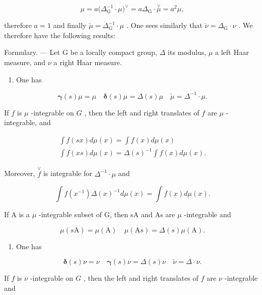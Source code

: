 \[
\mu = a \big (\Delta_ {\mathrm{G}} ^ {- 1} \cdot \mu \big) ^ {\vee} = a \Delta_ {\mathrm{G}} \cdot \stackrel {\vee} {\mu} = a ^ {2} \mu ,
\]

therefore \(a = 1\) and finally \(\check{\mu} = \Delta_{\mathrm{G}}^{-1}\cdot \mu\) . One sees similarly that \(\check{\nu} = \Delta_{\mathrm{G}}\cdot \nu\) . We therefore have the following results:

Formulary. --- Let G be a locally compact group, \(\Delta\) its modulus, \(\mu\) a left Haar measure, and \(\nu\) a right Haar measure.

\begin{enumerate}
\def\labelenumi{\arabic{enumi})}
\tightlist
\item
  One has
\end{enumerate}

\[
\boldsymbol {\gamma} (s) \mu = \mu \quad \boldsymbol {\delta} (s) \mu = \Delta (s) \mu \quad \check {\mu} = \Delta^ {- 1} \cdot \mu .\tag{20}
\]

If \(f\) is \(\mu\) -integrable on \(G\) , then the left and right translates of \(f\) are \(\mu\) -integrable, and

\[
\begin{array}{l} \int f (s x) d \mu (x) = \int f (x) d \mu (x) \\ \int f (x s) d \mu (x) = \Delta (s) ^ {- 1} \int f (x) d \mu (x). \end{array}\tag{21}
\]

Moreover, \(\stackrel{\vee}{f}\) is integrable for \(\Delta^{-1} \cdot \mu\) and

\[
\int f (x ^ {- 1}) \Delta (x) ^ {- 1} d \mu (x) = \int f (x) d \mu (x).\tag{22}
\]

If A is a \(\mu\) -integrable subset of G, then sA and As are \(\mu\) -integrable and

\[
\mu (s \mathrm{A}) = \mu (\mathrm{A}) \quad \mu (\mathrm{A} s) = \Delta (s) \mu (\mathrm{A}).\tag{23}
\]

\begin{enumerate}
\def\labelenumi{\arabic{enumi})}
\setcounter{enumi}{1}
\tightlist
\item
  One has
\end{enumerate}

\[
\boldsymbol {\delta} (s) \nu = \nu \quad \boldsymbol {\gamma} (s) \nu = \Delta (s) \nu \quad \check {\nu} = \Delta \cdot \nu .\tag{24}
\]

If \(f\) is \(\nu\) -integrable on \(G\) , then the left and right translates of \(f\) are \(\nu\) -integrable and

